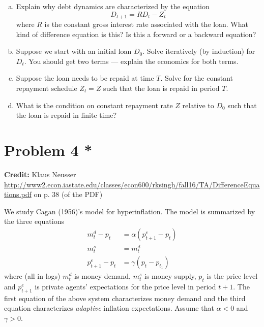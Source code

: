 \documentclass[11pt]{extarticle}
\theoremstyle{plain}
\theoremstyle{definition}
\begin{document}
\begin{enumerate}[(a)]
\item Explain why debt dynamics are characterized by the equation
\begin{equation*}
	D_{t+1} = RD_t - Z_t
\end{equation*}
where $R$ is the constant gross interest rate associated with the loan. What kind of difference equation is this? Is this a forward or a backward equation? 

\item Suppose we start with an initial loan $D_0$. Solve iteratively (by induction) for $D_t$. You should get two terms --- explain the economics for both terms.

\item Suppose the loan needs to be repaid at time $T$. Solve for the constant repayment schedule $Z_t = Z$ such that the loan is repaid in period $T$.

\item What is the condition on constant repayment rate $Z$ relative to $D_0$ such that the loan is repaid in finite time? 
\end{enumerate}



\vspace{10mm}
\section*{Problem 4 *}

\textbf{Credit:} Klaus Neusser \url{http://www2.econ.iastate.edu/classes/econ600/rksingh/fall16/TA/DifferenceEquations.pdf} on p. 38 (of the PDF)

\vspace{5mm}
\noindent
We study Cagan (1956)'s model for hyperinflation. The model is summarized by the three equations
\begin{align*}
	m_t^d - p_t &= \alpha (p_{t+1}^e - p_t) \\
	m_t^s &= m_t^d \\
	p_{t+1}^e - p_t &= \gamma(p_t - p_{t_1})
\end{align*}
where (all in logs) $m_t^d$ is money demand, $m_t^s$ is money supply, $p_t$ is the price level and $p_{t+1}^e$ is private agents' expectations for the price level in period $t+1$. The first equation of the above system characterizes money demand and the third equation characterizes \textit{adaptive} inflation expectations. Assume that $\alpha < 0$ and $\gamma > 0$.
\end{document}
